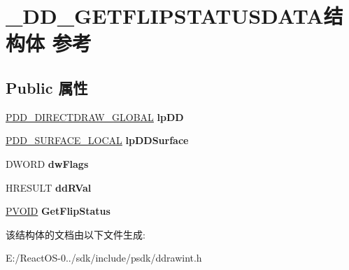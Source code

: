 \hypertarget{struct___d_d___g_e_t_f_l_i_p_s_t_a_t_u_s_d_a_t_a}{}\section{\+\_\+\+D\+D\+\_\+\+G\+E\+T\+F\+L\+I\+P\+S\+T\+A\+T\+U\+S\+D\+A\+T\+A结构体 参考}
\label{struct___d_d___g_e_t_f_l_i_p_s_t_a_t_u_s_d_a_t_a}
\subsection*{Public 属性}
\begin{DoxyCompactItemize}
\item 
\mbox{\label{struct___d_d___g_e_t_f_l_i_p_s_t_a_t_u_s_d_a_t_a_a7c4606985458ab541acd3b9db5d2cdd3}} 
\hyperlink{struct___d_d___d_i_r_e_c_t_d_r_a_w___g_l_o_b_a_l}{P\+D\+D\+\_\+\+D\+I\+R\+E\+C\+T\+D\+R\+A\+W\+\_\+\+G\+L\+O\+B\+AL} {\bfseries lp\+DD}
\item 
\mbox{\label{struct___d_d___g_e_t_f_l_i_p_s_t_a_t_u_s_d_a_t_a_a920c50e4ba9d5749762d74c6f18c9ba3}} 
\hyperlink{struct___d_d___s_u_r_f_a_c_e___l_o_c_a_l}{P\+D\+D\+\_\+\+S\+U\+R\+F\+A\+C\+E\+\_\+\+L\+O\+C\+AL} {\bfseries lp\+D\+D\+Surface}
\item 
\mbox{\label{struct___d_d___g_e_t_f_l_i_p_s_t_a_t_u_s_d_a_t_a_acbda6ea8f816497330ca9fa2afe69729}} 
D\+W\+O\+RD {\bfseries dw\+Flags}
\item 
\mbox{\label{struct___d_d___g_e_t_f_l_i_p_s_t_a_t_u_s_d_a_t_a_a9c536ee26adf6a65b3df5432804451da}} 
H\+R\+E\+S\+U\+LT {\bfseries dd\+R\+Val}
\item 
\mbox{\label{struct___d_d___g_e_t_f_l_i_p_s_t_a_t_u_s_d_a_t_a_a4d7b8b5c84d18bea698c4d251cd1357a}} 
\hyperlink{interfacevoid}{P\+V\+O\+ID} {\bfseries Get\+Flip\+Status}
\end{DoxyCompactItemize}


该结构体的文档由以下文件生成\+:\begin{DoxyCompactItemize}
\item 
E\+:/\+React\+O\+S-\/0../sdk/include/psdk/ddrawint.\+h\end{DoxyCompactItemize}

